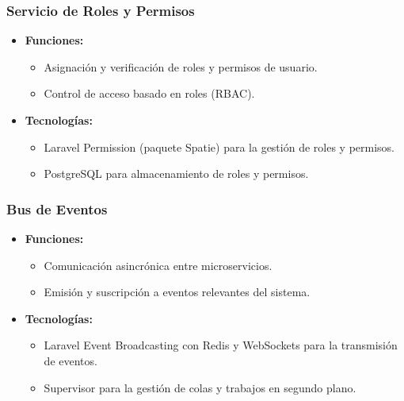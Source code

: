 \documentclass{article}
\begin{document}
\subsubsection{Servicio de Roles y Permisos}
\begin{itemize}
    \item \textbf{Funciones:}
          \begin{itemize}
              \item Asignación y verificación de roles y permisos de usuario.
              \item Control de acceso basado en roles (RBAC).
          \end{itemize}
    \item \textbf{Tecnologías:}
          \begin{itemize}
              \item Laravel Permission (paquete Spatie) para la gestión de roles y permisos.
              \item PostgreSQL para almacenamiento de roles y permisos.
          \end{itemize}
\end{itemize}

\subsubsection{Bus de Eventos}
\begin{itemize}
    \item \textbf{Funciones:}
          \begin{itemize}
              \item Comunicación asincrónica entre microservicios.
              \item Emisión y suscripción a eventos relevantes del sistema.
          \end{itemize}
    \item \textbf{Tecnologías:}
          \begin{itemize}
              \item Laravel Event Broadcasting con Redis y WebSockets para la transmisión de eventos.
              \item Supervisor para la gestión de colas y trabajos en segundo plano.
          \end{itemize}
\end{itemize}
\end{document}
